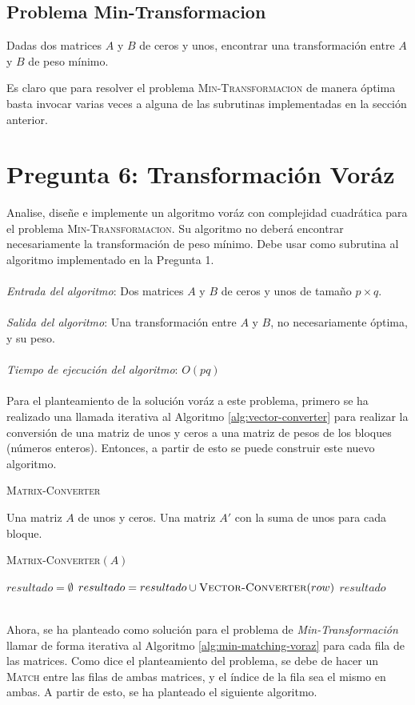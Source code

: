 \documentclass[conference]{IEEEtran}
\begin{document}
\subsection{Problema Min-Transformacion}
Dadas dos matrices $A$ y $B$ de ceros y unos, encontrar una transformación entre $A$ y $B$ de peso mínimo.

Es claro que para resolver el problema \textsc{Min-Transformacion} de manera óptima basta invocar varias veces a alguna de las subrutinas implementadas en la sección anterior.

\section{Pregunta 6: Transformación Voráz}
Analise, diseñe e implemente un algoritmo voráz con complejidad cuadrática para el problema \textsc{Min-Transformacion}. Su algoritmo no deberá encontrar necesariamente la transformación de peso mínimo. Debe usar como subrutina al algoritmo implementado en la Pregunta 1.\\\\
\textit{Entrada del algoritmo}: Dos matrices $A$ y $B$ de ceros y unos de tamaño $p \times q$.\\\\
\textit{Salida del algoritmo}: Una transformación entre $A$ y $B$, no necesariamente óptima, y su peso.\\\\
\textit{Tiempo de ejecución del algoritmo}: $O(pq)$\\\\
Para el planteamiento de la solución voráz a este problema, primero se ha realizado una llamada iterativa al Algoritmo \ref{alg:vector-converter} para realizar la conversión de una matriz de unos y ceros a una matriz de pesos de los bloques (números enteros). Entonces, a partir de esto se puede construir este nuevo algoritmo.

\begin{algorithm}
\caption{\textsc{Matrix-Converter}}
\scriptsize
\begin{algorithmic}
\REQUIRE Una matriz $A$ de unos y ceros.
\ENSURE Una matriz $A'$ con la suma de unos para cada bloque.
\begin{flushleft}
\textsc{Matrix-Converter}$(A)$
\end{flushleft}
    \STATE $resultado=\emptyset$
        \STATE $resultado=resultado \cup \textsc{Vector-Converter}(row)$
    \ENDFOR
    \RETURN $resultado$
\end{algorithmic}
\label{alg:matrix-converter}
\end{algorithm}
\verb||\\
Ahora, se ha planteado como solución para el problema de \textit{Min-Transformación} llamar de forma iterativa al Algoritmo \ref{alg:min-matching-voraz} para cada fila de las matrices. Como dice el planteamiento del problema, se debe de hacer un \textsc{Match} entre las filas de ambas matrices, y el índice de la fila sea el mismo en ambas. A partir de esto, se ha planteado el siguiente algoritmo.
\end{document}
